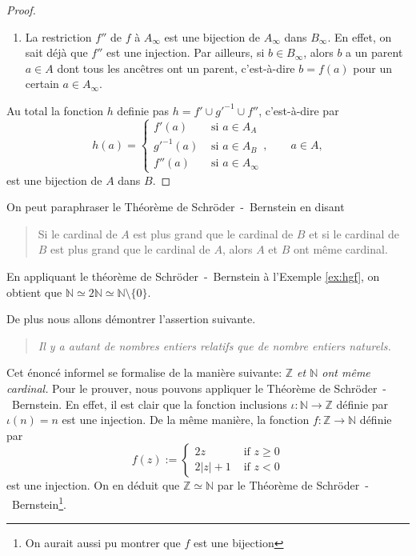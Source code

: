 \documentclass[french,course,oneside,theoremnosection]{lecture}
\newcommand{\N}{\mathbb{N}}
\newcommand{\Z}{\mathbb{Z}}
\begin{document}
\begin{proof}
\begin{enumerate}[(1)]
\item La restriction $f''$ de $f$ à $A_\infty$ est une bijection de $A_\infty$ dans $B_\infty$. En effet, on sait déjà que $f''$ est une injection. Par ailleurs, si $b\in B_\infty$, alors $b$ a un parent $a\in A$ dont tous les ancêtres ont un parent, c'est-à-dire $b=f(a)$ pour un certain $a\in A_\infty$.  
\end{enumerate}
Au total la fonction $h$ definie pas $h=f'\cup g'^{-1} \cup f''$, c'est-à-dire par
\[
h(a)=\left\{\begin{array}{ll}
f'(a) & \text{ si } a \in A_A\\
g'^{-1}(a) & \text{ si } a \in A_B \\
f''(a) & \text{ si } a \in A_\infty
\end{array}\right., \qquad a \in A,
\]
 est une bijection de $A$ dans $B$.
\end{proof}
On peut paraphraser le Théorème de Schröder~-~Bernstein en disant
\begin{quotation}
Si le cardinal de $A$ est plus grand que le cardinal de $B$ et si le cardinal de $B$ est plus grand que le cardinal de $A$, alors $A$ et $B$ ont même cardinal.
\end{quotation}

\begin{example} 
En appliquant le théorème de Schröder~-~Bernstein à l'Exemple \ref{ex:hgf}, on obtient que $\N \simeq 2\N \simeq \N\setminus\{0\}$.

De plus nous allons démontrer l'assertion suivante.
\begin{quotation}
\emph{Il y a autant de nombres entiers relatifs que de nombre entiers naturels.} 
\end{quotation}
Cet énoncé informel se formalise de la manière suivante: \emph{$\Z$ et $\N$ ont même cardinal.} Pour le prouver, nous pouvons appliquer le Théorème de Schröder~-~Bernstein. En effet, il est clair que la fonction inclusions $\iota \colon \N \to \Z$ définie par $\iota(n)=n$ est une injection. De la même manière, la fonction $f\colon \Z \to \N$ définie par
\[
f(z):= \left\{\begin{array}{ll}
2z & \text{ if } z\geq 0\\
2|z|+1 & \text{ if } z<0
\end{array}\right.
\]
est une injection. On en déduit que $\Z \simeq \N$ par le Théorème de Schröder~-~Bernstein\footnote{On aurait aussi pu montrer que $f$ est une bijection}.
\end{example}
\end{document}
